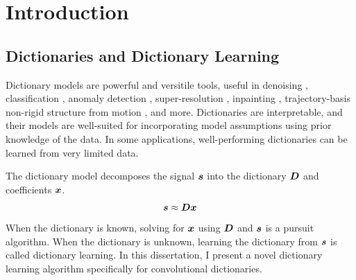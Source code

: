 \chapter{Introduction}


\section{Dictionaries and Dictionary Learning}
Dictionary models are powerful and versitile tools, useful in denoising \cite{wohlberg2016convolutional}, classification \cite{kong2012dictionary}, anomaly detection \cite{carroll2017outlier}, super-resolution \cite{polatkan2014bayesian}\cite{gu2015convolutional}, inpainting \cite{papyan2017convolutional}, trajectory-basis non-rigid structure from motion \cite{zhu2013convolutional}\cite{chodosh2020use}, and more. Dictionaries are interpretable, and their models are well-suited for incorporating model assumptions using prior knowledge of the data. In some applications, well-performing dictionaries can be learned from very limited data.

The dictionary model decomposes the signal $\bm{s}$ into the dictionary $\bm{D}$ and coefficients $\bm{x}$.
%
\begin{equation}
\bm{s} \approx \bm{D}\bm{x}
\end{equation}
%
When the dictionary is known, solving for $\bm{x}$ using $\bm{D}$ and $\bm{s}$ is a pursuit algorithm. When the dictionary is unknown, learning the dictionary from $\bm{s}$ is called dictionary learning. In this dissertation, I present a novel dictionary learning algorithm specifically for convolutional dictionaries.

